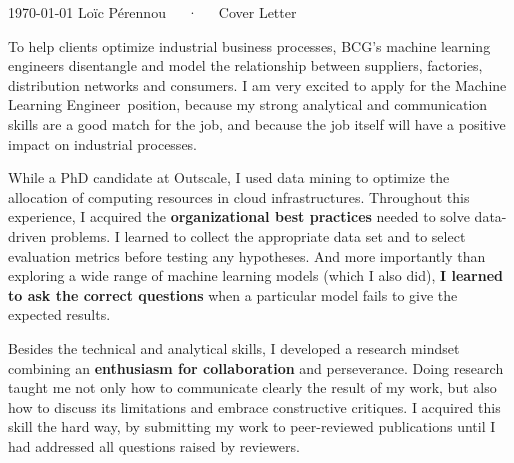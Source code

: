 \documentclass[11pt, a4paper]{awesome-cv}
\newcommand{\company}{BCG}
\newcommand{\job}{Machine Learning Engineer}
\begin{document}
\makecvheader[R]

\makecvfooter
  {\today}
  {Loïc Pérennou~~~·~~~Cover Letter}
  {}

\makelettertitle

\begin{cvletter}
  To help clients optimize industrial business processes, \company's machine learning engineers disentangle and model the relationship between suppliers, factories, distribution networks and consumers.  
  I am very excited to apply for the \job~position, because my strong analytical and communication skills are a good match for the job, and because the job itself will have a positive impact on industrial processes. 

While a PhD candidate at Outscale, I used data mining to optimize the allocation of computing resources in cloud infrastructures. 
Throughout this experience, I acquired the \textbf{organizational best practices} needed to solve data-driven problems.  
I learned to collect the appropriate data set and to select evaluation metrics before testing any hypotheses. 
And more importantly than exploring a wide range of machine learning models (which I also did), \textbf{I learned to ask the correct questions} when a particular model fails to give the expected results.  

Besides the technical and analytical skills, I developed a research mindset combining an \textbf{enthusiasm for collaboration} and perseverance.  
Doing research taught me not only how to communicate clearly the result of my work, but also how to discuss its limitations and embrace constructive critiques.  
I acquired this skill the hard way, by submitting my work to peer-reviewed publications until I had addressed all questions raised by reviewers. 


\end{cvletter}
\end{document}
